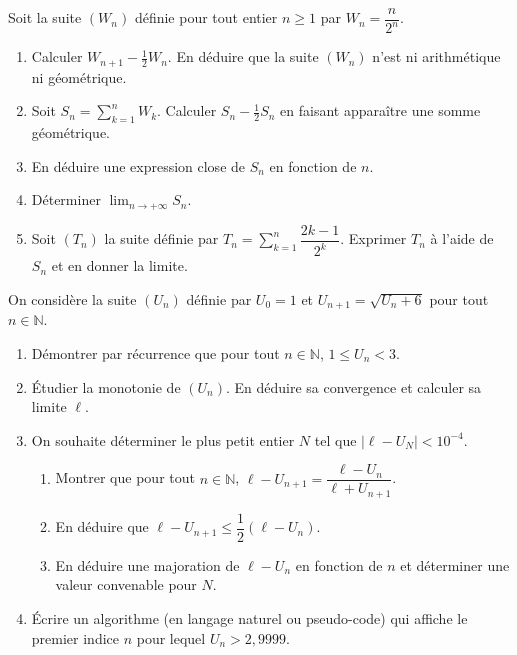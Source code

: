 \documentclass[11pt]{article}
\begin{document}
\begin{exercice}
Soit la suite $(W_n)$ définie pour tout entier $n \ge 1$ par $W_n = \dfrac{n}{2^n}$.
\begin{enumerate}
    \item Calculer $W_{n+1} - \frac{1}{2}W_n$. En déduire que la suite $(W_n)$ n'est ni arithmétique ni géométrique.
    \item Soit $S_n = \sum_{k=1}^{n} W_k$. Calculer $S_n - \frac{1}{2}S_n$ en faisant apparaître une somme géométrique.
    \item En déduire une expression close de $S_n$ en fonction de $n$.
    \item Déterminer $\displaystyle\lim_{n\to +\infty} S_n$.
    \item Soit $(T_n)$ la suite définie par $T_n = \sum_{k=1}^{n} \dfrac{2k-1}{2^k}$. Exprimer $T_n$ à l'aide de $S_n$ et en donner la limite.
\end{enumerate}
\end{exercice}

\begin{exercice}
On considère la suite $(U_n)$ définie par $U_0 = 1$ et $U_{n+1} = \sqrt{U_n + 6}$ pour tout $n \in \mathbb{N}$.
\begin{enumerate}
    \item Démontrer par récurrence que pour tout $n \in \mathbb{N}$, $1 \le U_n < 3$.
    \item Étudier la monotonie de $(U_n)$. En déduire sa convergence et calculer sa limite $\ell$.
    \item On souhaite déterminer le plus petit entier $N$ tel que $|\ell - U_N| < 10^{-4}$.
    \begin{enumerate}
        \item Montrer que pour tout $n \in \mathbb{N}$, $\ell - U_{n+1} = \dfrac{\ell - U_n}{\ell + U_{n+1}}$.
        \item En déduire que $\ell - U_{n+1} \le \dfrac{1}{2}(\ell - U_n)$.
        \item En déduire une majoration de $\ell - U_n$ en fonction de $n$ et déterminer une valeur convenable pour $N$.
    \end{enumerate}
    \item Écrire un algorithme (en langage naturel ou pseudo-code) qui affiche le premier indice $n$ pour lequel $U_n > 2,9999$.
\end{enumerate}
\end{exercice}
\end{document}
